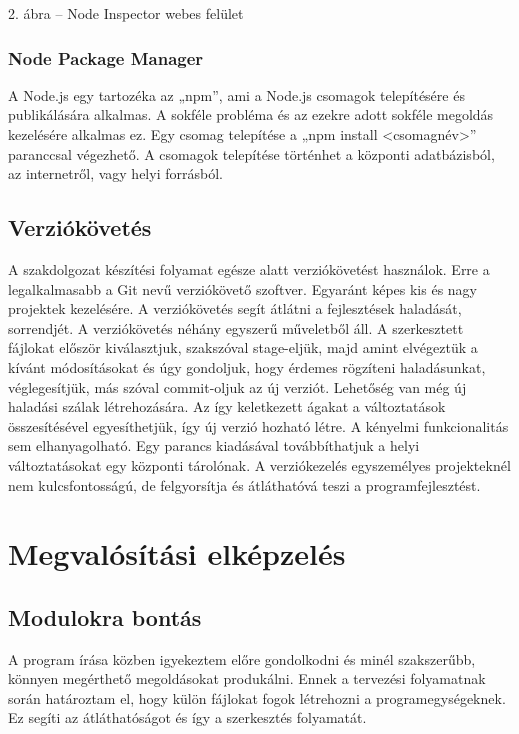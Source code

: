\documentclass[]{article}
\begin{document}
2. ábra -- Node Inspector webes felület


\subsubsection{Node Package Manager}

A Node.js egy tartozéka az „npm'', ami a Node.js csomagok telepítésére
és publikálására alkalmas. A sokféle probléma és az ezekre adott sokféle
megoldás kezelésére alkalmas ez. Egy csomag telepítése a „npm install
\textless{}csomagnév\textgreater{}'' paranccsal végezhető. A csomagok
telepítése történhet a központi adatbázisból, az internetről, vagy helyi
forrásból.


\subsection{Verziókövetés}

A szakdolgozat készítési folyamat egésze alatt verziókövetést használok.
Erre a legalkalmasabb a Git nevű verziókövető szoftver. Egyaránt képes
kis és nagy projektek kezelésére. A verziókövetés segít átlátni a
fejlesztések haladását, sorrendjét. A verziókövetés néhány egyszerű
műveletből áll. A szerkesztett fájlokat először kiválasztjuk, szakszóval
stage-eljük, majd amint elvégeztük a kívánt módosításokat és úgy
gondoljuk, hogy érdemes rögzíteni haladásunkat, véglegesítjük, más
szóval commit-oljuk az új verziót. Lehetőség van még új haladási szálak
létrehozására. Az így keletkezett ágakat a változtatások összesítésével
egyesíthetjük, így új verzió hozható létre. A kényelmi funkcionalitás
sem elhanyagolható. Egy parancs kiadásával továbbíthatjuk a helyi
változtatásokat egy központi tárolónak. A verziókezelés egyszemélyes
projekteknél nem kulcsfontosságú, de felgyorsítja és átláthatóvá teszi a
programfejlesztést.


\section{Megvalósítási
elképzelés}


\subsection{Modulokra bontás }

A program írása közben igyekeztem előre gondolkodni és minél
szakszerűbb, könnyen megérthető megoldásokat produkálni. Ennek a
tervezési folyamatnak során határoztam el, hogy külön fájlokat fogok
létrehozni a programegységeknek. Ez segíti az átláthatóságot és így a
szerkesztés folyamatát.
\end{document}
